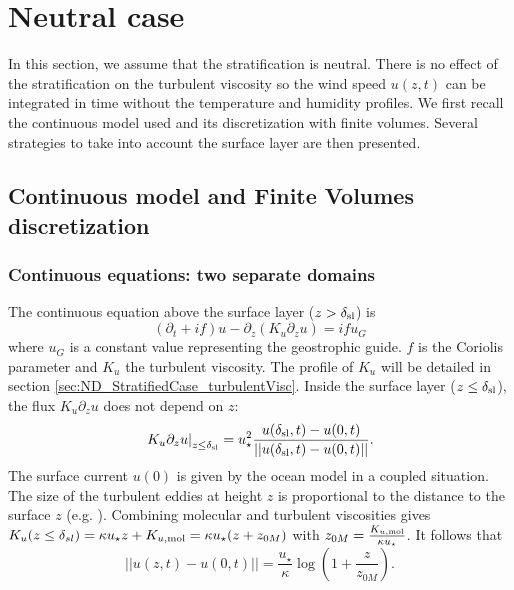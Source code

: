 \section{Neutral case}
In this section, we assume that the stratification is neutral.
There is no effect of the stratification on the turbulent viscosity
so the wind speed $u(z, t)$ can be integrated in time
without the temperature and humidity profiles.
We first recall the continuous model used and its
discretization with finite volumes. Several strategies to
take into account the surface layer are then presented.
\subsection{Continuous model and Finite Volumes discretization}
\subsubsection{Continuous equations: two separate domains}
\label{sec:ND_NeutralCase}
The continuous equation above the surface layer
($z > \delta_{\rm sl}$) is
\begin{equation}
	\label{eq:ND_NeutralCase_EkmanEq}
  (\partial_t + if) u - \partial_z (K_u \partial_z u) = if u_G
\end{equation}
where $u_G$ is a constant value representing the geostrophic guide.
$f$ is the Coriolis parameter and $K_u$ the turbulent viscosity.
The profile of $K_u$ will be detailed
in section \ref{sec:ND_StratifiedCase_turbulentVisc}.
Inside the surface layer ($z \leq \delta_{\rm sl}$), the flux
$K_u \partial_z u$ does not depend on $z$:
\begin{equation}
	\label{eq:ND_NeutralCase_constantFlux}
	\left.K_u \partial_z u \right|_{z\leq \delta_{\rm sl}}
	= u_\star^2
	\frac{u(\delta_{\rm sl}, t)-u(0,t)}
	{||u(\delta_{\rm sl}, t)-u(0,t)||}.
\end{equation}
The surface current $u(0)$ is given by the ocean model in a coupled
situation.
The size of the turbulent eddies at height $z$
is proportional to the distance to the surface $z$
(e.g. \cite{kawai_wall-modeling_2012}). Combining molecular and
turbulent viscosities gives 
$K_u(z\leq \delta_{sl}) = \kappa u_\star z + K_{u, {\rm mol}}
= \kappa u_\star (z + z_{0M})$ with $z_{0M} = \frac{K_{u, {\rm mol}}}{\kappa u_\star}$.
It follows that
\begin{equation}
\label{eq:ND_NeutralCase_WallLaw}
	||u(z, t) - u(0, t)|| = \frac{{u_\star}}{\kappa}
	\log(1+\frac{z}{z_{0M}}).
\end{equation}
